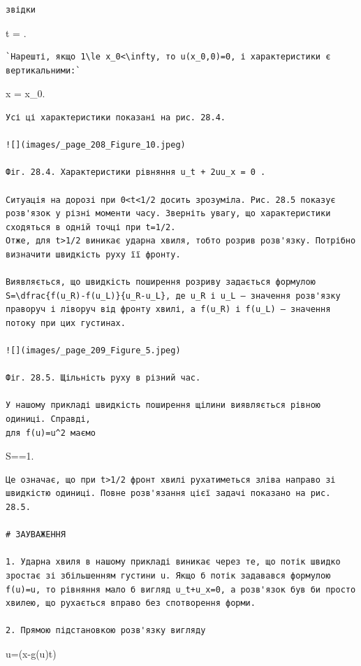 \documentclass[
  ukrainian,
]{article}
\begin{document}
\begin{verbatim}
звідки
\end{verbatim}

t = .

\begin{verbatim}
`Нарешті, якщо 1\le x_0<\infty, то u(x_0,0)=0, і характеристики є вертикальними:`
\end{verbatim}

x = x\_0.

\begin{verbatim}
Усі ці характеристики показані на рис. 28.4.

![](images/_page_208_Figure_10.jpeg)

Фіг. 28.4. Характеристики рівняння u_t + 2uu_x = 0 .

Ситуація на дорозі при 0<t<1/2 досить зрозуміла. Рис. 28.5 показує розв'язок у різні моменти часу. Зверніть увагу, що характеристики сходяться в одній точці при t=1/2.
Отже, для t>1/2 виникає ударна хвиля, тобто розрив розв'язку. Потрібно визначити швидкість руху її фронту.

Виявляється, що швидкість поширення розриву задається формулою
S=\dfrac{f(u_R)-f(u_L)}{u_R-u_L}, де u_R і u_L — значення розв'язку праворуч і ліворуч від фронту хвилі, а f(u_R) і f(u_L) — значення потоку при цих густинах.

![](images/_page_209_Figure_5.jpeg)

Фіг. 28.5. Щільність руху в різний час.

У нашому прикладі швидкість поширення щілини виявляється рівною одиниці. Справді,
для f(u)=u^2 маємо
\end{verbatim}

S==1.

\begin{verbatim}
Це означає, що при t>1/2 фронт хвилі рухатиметься зліва направо зі швидкістю одиниці. Повне розв'язання цієї задачі показано на рис. 28.5.

# ЗАУВАЖЕННЯ

1. Ударна хвиля в нашому прикладі виникає через те, що потік швидко зростає зі збільшенням густини u. Якщо б потік задавався формулою f(u)=u, то рівняння мало б вигляд u_t+u_x=0, а розв'язок був би просто хвилею, що рухається вправо без спотворення форми.

2. Прямою підстановкою розв'язку вигляду
\end{verbatim}

u=\varphi(x-g(u)t)
\end{document}
